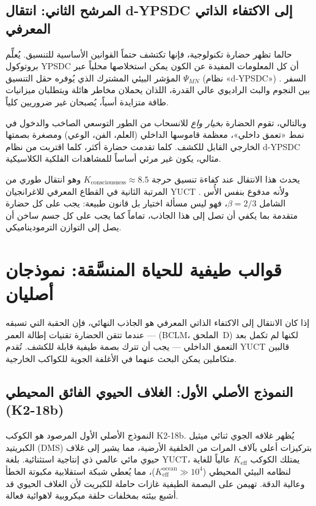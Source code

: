 \documentclass[11pt,a4paper]{article}
\begin{document}
	\subsection{المرشح الثاني: انتقال d-YPSDC إلى الاكتفاء الذاتي المعرفي}
	\label{sec:filter2}
	حالما تظهر حضارة تكنولوجية، فإنها تكتشف حتماً القوانين الأساسية للتنسيق. يُعلِّم بروتوكول YPSDC أن كل المعلومات المفيدة عن الكون يمكن استخلاصها محلياً عبر المؤشر البيئي المشترك الذي يُوفره حقل التنسيق \(\Psi_{MN}\) (نظام «d-YPSDC») \citep{AppOmega, AppT}. السفر بين النجوم والبث الراديوي عالي القدرة، اللذان يحملان مخاطر هائلة ويتطلبان ميزانيات طاقة متزايدة أسياً، يُصبحان غير ضروريين كلياً.
	
	وبالتالي، تقوم الحضارة \emph{بخيار واع} للانسحاب من الطور التوسعي الصاخب والدخول في نمط «تعمق داخلي»، معظمة قاموسها الداخلي (العلم، الفن، الوعي) ومصغرة بصمتها الخارجي القابل للكشف. كلما تقدمت حضارة أكثر، كلما اقتربت من نظام d-YPSDC مثالي، يكون غير مرئي أساساً للمشاهدات الفلكية الكلاسيكية.
	
	يحدث هذا الانتقال عند كفاءة تنسيق حرجة \(K_{\mathrm{consciousness}}\approx 8.5\) وهو انتقال طوري من المرتبة الثانية في القطاع المعرفي للاغرانجيان YUCT \citep{AppH}. ولأنه مدفوع بنفس الأُس الشامل \(\beta=2/3\)، فهو ليس مسألة اختيار بل قانون طبيعة: يجب على كل حضارة متقدمة بما يكفي أن تصل إلى هذا الجاذب، تماماً كما يجب على كل جسم ساخن أن يصل إلى التوازن الترموديناميكي.
	
	\section{قوالب طيفية للحياة المنسَّقة: نموذجان أصليان}
	\label{sec:spectra}
	
	إذا كان الانتقال إلى الاكتفاء الذاتي المعرفي هو الجاذب النهائي، فإن الحقبة التي تسبقه — عندما تتقن الحضارة تقنيات إطالة العمر (BCLM، الملحق~D) لكنها لم تكمل بعد التعمق الداخلي — يجب أن تترك بصمة طيفية قابلة للكشف. تُقدم YUCT قالبين متكاملين يمكن البحث عنهما في الأغلفة الجوية للكواكب الخارجية.
	
	\subsection{النموذج الأصلي الأول: الغلاف الحيوي الفائق المحيطي (K2-18b)}
	النموذج الأصلي الأول المرصود هو الكوكب K2-18b. يُظهر غلافه الجوي ثنائي ميثيل الكبريتيد (DMS) بتركيزات أعلى بآلاف المرات من الخلفية الأرضية، مما يشير إلى غلاف حيوي مائي عالمي ذي إنتاجية استثنائية. بلغة YUCT، يمتلك الكوكب \(K_{\mathrm{eff}}\) عالياً للغاية لنظامه البيئي المحيطي (\(K_{\mathrm{eff}}^{\mathrm{ocean}} \gg 10^4\))، مما يُعطي شبكة استقلابية مكبوتة الخطأ وعالية الدقة. تهيمن على البصمة الطيفية غازات حاملة للكبريت لأن الغلاف الحيوي قد أشبع بيئته بمخلفات حلقة ميكروبية لاهوائية فعالة.
	
\end{document}
